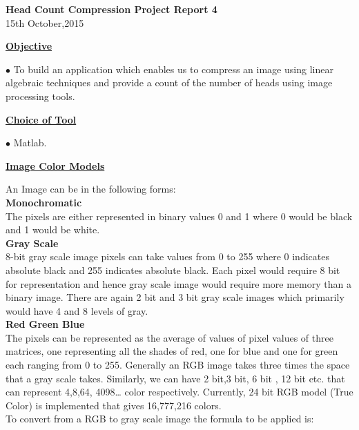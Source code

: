 \documentclass[10pt,a4paper]{article}
\begin{document}
\begin{center}
\textbf{Head Count Compression Project Report 4}\\ 		%
15th October,2015										%
\end{center}
\begin{center}
\underline{\textbf{Objective}} \\
\end{center}	
$\bullet$ To build an application which enables us to compress an image using linear algebraic techniques and provide a count of the number of heads using image processing tools.
\begin{center}
\underline{\textbf{Choice of Tool}} 
\end{center}
$\bullet$ Matlab.\\
\begin{center}
\underline{\textbf{Image Color Models}} 
\end{center}
An Image can be in the following forms:\\
\textbf{Monochromatic}\\
The pixels are either represented in binary values 0 and 1 where 0 would be black and 1 would be white.
\\
\textbf{Gray Scale}
\\
8-bit gray scale image pixels can take values from 0 to 255 where 0 indicates absolute black and 255 indicates absolute black. Each pixel would require 8 bit for representation and hence gray scale image would require more memory than a binary image. There are again 2 bit and 3 bit gray scale images which primarily would have 4 and 8 levels of gray.\\
\textbf{Red Green Blue}\\
The pixels can be represented as the average of values of pixel values of three matrices, one representing all the shades of red, one for blue and one for green each ranging from 0 to 255. Generally an RGB image takes three times the space that a gray scale takes. Similarly, we can have 2 bit,3 bit, 6 bit  , 12 bit etc. that can represent 4,8,64, 4098… color respectively. Currently, 24 bit RGB model (True Color) is implemented that gives 16,777,216 colors.\\

To convert from a RGB to gray scale image the formula to be applied is:\\
 
\end{document}
